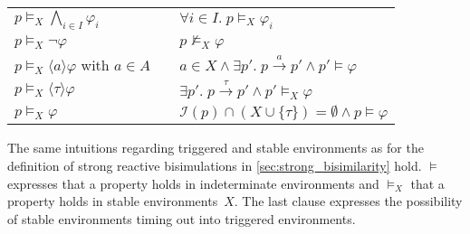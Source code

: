 \begin{isabellebody}
\begin{isamarkuptext}
\begin{tabular}{l l l}
    
    $p \vDash_X \bigwedge_{i \in I} \varphi_i$ 
    & \text{if} 
    & $\forall i \in I.\; p \vDash_X \varphi_i$ \\
    
    $p \vDash_X \neg\varphi$
    & \text{if} 
    & $p \not\vDash_X \varphi$ \\
    
    $p \vDash_X \langle a \rangle \varphi$ \quad with $a \in A$
    & \text{if} 
    & $a \in X \wedge \exists p'.\; p \xrightarrow{a} p' \wedge p' \vDash \varphi$ \\
    
    $p \vDash_X \langle \tau \rangle \varphi$
    & \text{if} 
    & $\exists p'.\; p \xrightarrow{\tau} p' \wedge p' \vDash_X \varphi$ \\[0.5em]
    
    
    $p \vDash_X \varphi$
    & \text{if} 
    & $\mathcal{I}(p) \cap (X \cup \{\tau\}) = \emptyset \wedge p \vDash \varphi$
\end{tabular}%
\end{isamarkuptext}\isamarkuptrue%
%
\begin{isamarkuptext}%
The same intuitions regarding triggered and stable environments as for the definition of strong reactive bisimulations in \cref{sec:strong_bisimilarity} hold. $\vDash$ expresses that a property holds in indeterminate environments and $\vDash_X$ that a property holds in stable environments~$X$. The last clause expresses the possibility of stable environments timing out into triggered environments.


\end{isamarkuptext}
\end{isabellebody}
